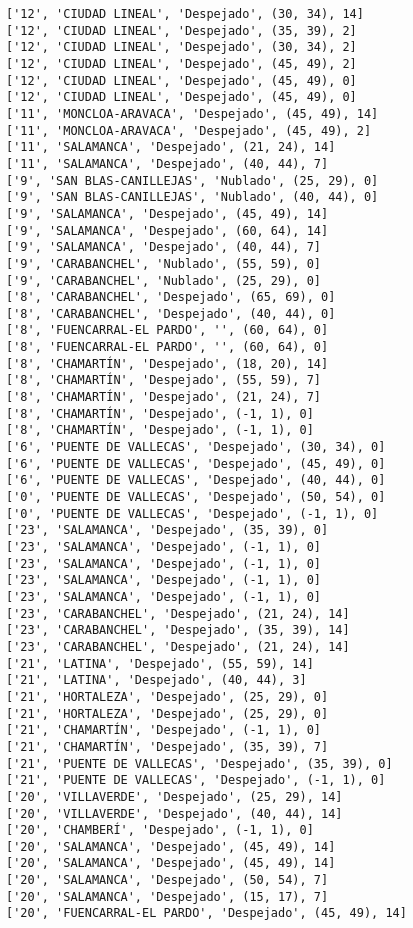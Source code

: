 \documentclass[11pt]{article}
\begin{document}
\begin{Verbatim}[commandchars=\\\{\}]
['12', 'CIUDAD LINEAL', 'Despejado', (30, 34), 14]
['12', 'CIUDAD LINEAL', 'Despejado', (35, 39), 2]
['12', 'CIUDAD LINEAL', 'Despejado', (30, 34), 2]
['12', 'CIUDAD LINEAL', 'Despejado', (45, 49), 2]
['12', 'CIUDAD LINEAL', 'Despejado', (45, 49), 0]
['12', 'CIUDAD LINEAL', 'Despejado', (45, 49), 0]
['11', 'MONCLOA-ARAVACA', 'Despejado', (45, 49), 14]
['11', 'MONCLOA-ARAVACA', 'Despejado', (45, 49), 2]
['11', 'SALAMANCA', 'Despejado', (21, 24), 14]
['11', 'SALAMANCA', 'Despejado', (40, 44), 7]
['9', 'SAN BLAS-CANILLEJAS', 'Nublado', (25, 29), 0]
['9', 'SAN BLAS-CANILLEJAS', 'Nublado', (40, 44), 0]
['9', 'SALAMANCA', 'Despejado', (45, 49), 14]
['9', 'SALAMANCA', 'Despejado', (60, 64), 14]
['9', 'SALAMANCA', 'Despejado', (40, 44), 7]
['9', 'CARABANCHEL', 'Nublado', (55, 59), 0]
['9', 'CARABANCHEL', 'Nublado', (25, 29), 0]
['8', 'CARABANCHEL', 'Despejado', (65, 69), 0]
['8', 'CARABANCHEL', 'Despejado', (40, 44), 0]
['8', 'FUENCARRAL-EL PARDO', '', (60, 64), 0]
['8', 'FUENCARRAL-EL PARDO', '', (60, 64), 0]
['8', 'CHAMARTÍN', 'Despejado', (18, 20), 14]
['8', 'CHAMARTÍN', 'Despejado', (55, 59), 7]
['8', 'CHAMARTÍN', 'Despejado', (21, 24), 7]
['8', 'CHAMARTÍN', 'Despejado', (-1, 1), 0]
['8', 'CHAMARTÍN', 'Despejado', (-1, 1), 0]
['6', 'PUENTE DE VALLECAS', 'Despejado', (30, 34), 0]
['6', 'PUENTE DE VALLECAS', 'Despejado', (45, 49), 0]
['6', 'PUENTE DE VALLECAS', 'Despejado', (40, 44), 0]
['0', 'PUENTE DE VALLECAS', 'Despejado', (50, 54), 0]
['0', 'PUENTE DE VALLECAS', 'Despejado', (-1, 1), 0]
['23', 'SALAMANCA', 'Despejado', (35, 39), 0]
['23', 'SALAMANCA', 'Despejado', (-1, 1), 0]
['23', 'SALAMANCA', 'Despejado', (-1, 1), 0]
['23', 'SALAMANCA', 'Despejado', (-1, 1), 0]
['23', 'SALAMANCA', 'Despejado', (-1, 1), 0]
['23', 'CARABANCHEL', 'Despejado', (21, 24), 14]
['23', 'CARABANCHEL', 'Despejado', (35, 39), 14]
['23', 'CARABANCHEL', 'Despejado', (21, 24), 14]
['21', 'LATINA', 'Despejado', (55, 59), 14]
['21', 'LATINA', 'Despejado', (40, 44), 3]
['21', 'HORTALEZA', 'Despejado', (25, 29), 0]
['21', 'HORTALEZA', 'Despejado', (25, 29), 0]
['21', 'CHAMARTÍN', 'Despejado', (-1, 1), 0]
['21', 'CHAMARTÍN', 'Despejado', (35, 39), 7]
['21', 'PUENTE DE VALLECAS', 'Despejado', (35, 39), 0]
['21', 'PUENTE DE VALLECAS', 'Despejado', (-1, 1), 0]
['20', 'VILLAVERDE', 'Despejado', (25, 29), 14]
['20', 'VILLAVERDE', 'Despejado', (40, 44), 14]
['20', 'CHAMBERÍ', 'Despejado', (-1, 1), 0]
['20', 'SALAMANCA', 'Despejado', (45, 49), 14]
['20', 'SALAMANCA', 'Despejado', (45, 49), 14]
['20', 'SALAMANCA', 'Despejado', (50, 54), 7]
['20', 'SALAMANCA', 'Despejado', (15, 17), 7]
['20', 'FUENCARRAL-EL PARDO', 'Despejado', (45, 49), 14]

\end{Verbatim}
\end{document}

